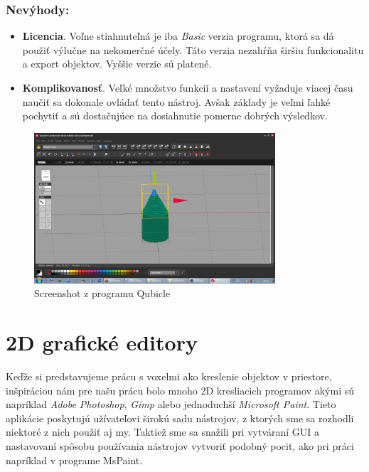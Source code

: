\subsubsection{Nevýhody:}
\begin{itemize}
	\item \textbf{Licencia}. Voľne stiahnuteľná je iba \textit{Basic} verzia programu, ktorá sa dá použiť výlučne na nekomerčné účely. Táto verzia nezahŕňa širšiu funkcionalitu a export objektov. Vyššie verzie sú platené.
	\item \textbf{Komplikovanosť}. Veľké množstvo funkcií a nastavení vyžaduje viacej času naučiť sa dokonale ovládať tento nástroj. Avšak základy je veľmi ľahké pochytiť a sú dostačujúce na dosiahnutie pomerne dobrých výsledkov.
\end{itemize}

\begin{figure}[ht!]
	\centering
	\includegraphics[width=0.8\textwidth]{qubicle2.jpg}
	\caption[Qubicle]{Screenshot z programu Qubicle}
	\label{obr:qubicle}
\end{figure}

\section{2D grafické editory}
Keďže si predstavujeme prácu s voxelmi ako kreslenie objektov v priestore, inšpiráciou nám pre našu prácu bolo mnoho 2D kresliacich programov akými sú napríklad \textit{Adobe Photoshop}, \textit{Gimp} alebo jednoduchší \textit{Microsoft Paint}. Tieto aplikácie poskytujú užívateľovi širokú sadu nástrojov, z ktorých sme sa rozhodli niektoré z nich použiť aj my. Taktiež sme sa snažili pri vytváraní GUI a nastavovaní spôsobu používania nástrojov vytvoriť podobný pocit, ako pri práci napríklad v programe MsPaint.

